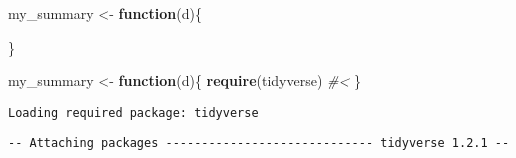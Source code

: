 \documentclass[12pt,letterpaperpaper,openany]{book}
\newenvironment{Shaded}{\begin{snugshade}}{\end{snugshade}}
\newcommand{\CommentTok}[1]{\textcolor[rgb]{0.56,0.35,0.01}{\textit{#1}}}
\newcommand{\ControlFlowTok}[1]{\textcolor[rgb]{0.13,0.29,0.53}{\textbf{#1}}}
\newcommand{\DataTypeTok}[1]{\textcolor[rgb]{0.13,0.29,0.53}{#1}}
\newcommand{\ErrorTok}[1]{\textcolor[rgb]{0.64,0.00,0.00}{\textbf{#1}}}
\newcommand{\KeywordTok}[1]{\textcolor[rgb]{0.13,0.29,0.53}{\textbf{#1}}}
\newcommand{\NormalTok}[1]{#1}
\newcommand{\OperatorTok}[1]{\textcolor[rgb]{0.81,0.36,0.00}{\textbf{#1}}}
\newcommand{\StringTok}[1]{\textcolor[rgb]{0.31,0.60,0.02}{#1}}
\begin{document}
\begin{Shaded}
\begin{Highlighting}[]
\NormalTok{my_summary <-}\StringTok{ }\ControlFlowTok{function}\NormalTok{(d)\{}

\NormalTok{\}}
\end{Highlighting}
\end{Shaded}

\begin{Shaded}
\begin{Highlighting}[]
\NormalTok{my_summary <-}\StringTok{ }\ControlFlowTok{function}\NormalTok{(d)\{}
  \KeywordTok{require}\NormalTok{(tidyverse) }\CommentTok{#<}
\NormalTok{\}}
\end{Highlighting}
\end{Shaded}

\begin{Shaded}
\end{Shaded}

\begin{verbatim}
Loading required package: tidyverse
\end{verbatim}

\begin{verbatim}
-- Attaching packages ----------------------------- tidyverse 1.2.1 --
\end{verbatim}
\end{document}
